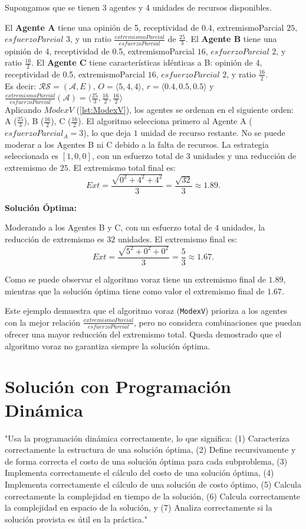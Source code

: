 \documentclass[letterpaper,10pt]{article}
\begin{document}
Supongamos que se tienen 3 agentes y 4 unidades de recursos disponibles.

El \textbf{Agente A} tiene una opinión de 5, receptividad de 0.4, extremismoParcial \(25\), $esfuerzoParcial$ \(3\), y un ratio $\frac{extremismoParcial}{esfuerzoParcial}$ de \(\frac{25}{3}\). El \textbf{Agente B} tiene una opinión de 4, receptividad de 0.5, extremismoParcial \(16\), $esfuerzoParcial$ \(2\), y ratio \(\frac{16}{2}\). El \textbf{Agente C} tiene características idénticas a B: opinión de 4, receptividad de 0.5, extremismoParcial \(16\), $esfuerzoParcial$ \(2\), y ratio \(\frac{16}{2}\).
\\

Es decir: $\mathcal{R} \mathcal{S} = (\mathcal{A},E)$, $O=\langle 5,4,4 \rangle$, $r=\langle 0.4, 0.5, 0.5\rangle$ y $\frac{extremismoParcial}{esfuerzoParcial}(\mathcal{A})=\langle \frac{25}{3},\frac{16}{2},\frac{16}{2} \rangle $
\\

Aplicando $ModexV$ (\ref{lst:ModexV}), los agentes se ordenan en el siguiente orden: A ($\frac{25}{3}$), B ($\frac{16}{2}$), C ($\frac{16}{2}$). El algoritmo selecciona primero al Agente A (\(esfuerzoParcial_A = 3\)), lo que deja \(1\) unidad de recurso restante. No se puede moderar a los Agentes B ni C debido a la falta de recursos. La estrategia seleccionada es \([1, 0, 0]\), con un esfuerzo total de \(3\) unidades y una reducción de extremismo de \(25\). El extremismo total final es:
\[
Ext = \frac{\sqrt{0^2 + 4^2 + 4^2}}{3} = \frac{\sqrt{32}}{3} \approx 1.89.
\]

\textbf{Solución Óptima:}  

Moderando a los Agentes B y C, con un esfuerzo total de \(4\) unidades, la reducción de extremismo es \(32\) unidades. El extremismo final es:
\[
Ext = \frac{\sqrt{5^2 + 0^2 + 0^2}}{3} = \frac{5}{3} \approx 1.67.
\]

Como se puede observar el algoritmo voraz tiene un extremismo final de \(1.89\), mientras que la solución óptima tiene como valor el extremismo final de \(1.67\).
 
Este ejemplo demuestra que el algoritmo voraz (\texttt{ModexV}) prioriza a los agentes con la mejor relación $\frac{extremismoParcial}{esfuerzoParcial}$, pero no considera combinaciones que puedan ofrecer una mayor reducción del extremismo total. Queda demostrado que el algoritmo voraz no garantiza siempre la solución óptima.

\section{Solución con Programación Dinámica}
\label{sec:programacion_dinamica}
"Usa la programación dinámica correctamente, lo que significa: (1) Caracteriza correctamente la estructura de una solución óptima, (2) Define recursivamente y de forma correcta el costo de una solución óptima para cada subproblema, (3) Implementa correctamente el cálculo del costo de una solución óptima, (4) Implementa correctamente el cálculo de una solución de costo óptimo, (5) Calcula correctamente la complejidad en tiempo de la solución, (6) Calcula correctamente la complejidad en espacio de la solución, y (7) Analiza correctamente si la solución provista es útil en la práctica."
\end{document}
